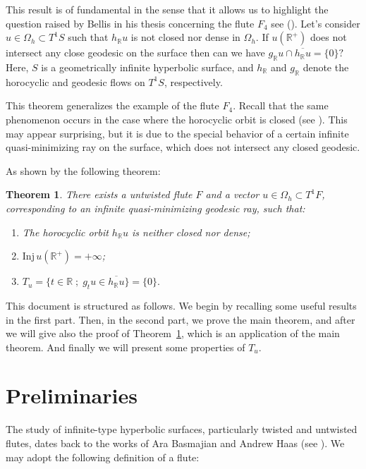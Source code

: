 \documentclass[11pt]{amsart}
\newtheorem{thm}{Theorem}[section]
\begin{document}
This result is of fundamental in the sense that it allows us to highlight the question raised by Bellis in his thesis concerning the flute \( F_{4} \) see (\cite{BellisThesis}).
Let's consider $u \in \Omega_{h} \subset T^{1}S $ such that $h_{\mathbb{R}}u$ is not closed nor dense in $\Omega_{h}.$ If $u(\mathbb{R^{+}})$ does not intersect any close geodesic on the surface then can we have $g_{\mathbb{R}}u \cap \overline{h_{\mathbb{R}}u} = \{0\}?
$
Here, $S$ is a geometrically infinite hyperbolic surface, and $h_{\mathbb{R}}$ and $g_{\mathbb{R}}$ denote the horocyclic and geodesic flows on $T^{1}S$, respectively.  

This theorem generalizes the example of the flute $F_{4}$. Recall that the same phenomenon occurs in the case where the horocyclic orbit is closed (see \cite{BellisThesis}).  
This may appear surprising, but it is due to the special behavior of a certain infinite quasi-minimizing ray on the surface, which does not intersect any closed geodesic.  

As shown by the following theorem:

\begin{thm}\label{TAHA}
There exists a untwisted flute \( F \) and a vector \( u \in \Omega_{h} \subset T^{1}F \), corresponding to an infinite quasi-minimizing geodesic ray, such that:
\begin{enumerate}
    \item The horocyclic orbit \( h_{\mathbb{R}}u \) is neither closed nor dense;
    \item \( \mathrm{Inj}\, u(\mathbb{R}^{+}) = +\infty \);
    \item \( T_{u} = \{ t \in \mathbb{R} \; ; \; g_{t}u \in \overline{h_{\mathbb{R}}u} \} = \{0\}. \)
\end{enumerate}
\end{thm}
This document is structured as follows. We begin by recalling some useful results in the first part. Then, in the second part, we prove the main theorem, and after we will give also the proof of Theorem~\ref{TAHA}, which is an application of the main theorem. And finally we will present some properties of $T_{u}.$








\section{Preliminaries}

The study of infinite-type hyperbolic surfaces, particularly twisted and untwisted flutes, dates back to the works of Ara Basmajian and Andrew Haas (see \cite{AB} ).  
We may adopt the following definition of a flute:
\end{document}
